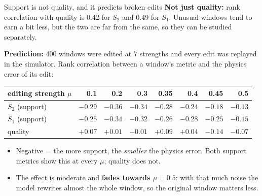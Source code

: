 \documentclass[aspectratio=169,10pt]{beamer}
\begin{document}
\begin{frame}{Support is not quality, and it predicts broken edits}
\textbf{Not just quality:} rank correlation with quality is 0.42 for $S_2$ and 0.49 for $S_1$. Unusual windows tend to earn a bit less, but the two are far from the same, so they can be studied separately.
\vspace{0.6em}

\textbf{Prediction:} 400 windows were edited at 7 strengths and every edit was replayed in the simulator. Rank correlation between a window's metric and the physics error of its edit:
\vspace{0.3em}

\centering
\begin{tabular}{lrrrrrrr}
\toprule
editing strength $\mu$ & 0.1 & 0.2 & 0.3 & 0.35 & 0.4 & 0.45 & 0.5\\
\midrule
$S_2$ (support) & $-0.29$ & $-0.36$ & $-0.34$ & $-0.28$ & $-0.24$ & $-0.18$ & $-0.13$\\
$S_1$ (support) & $-0.25$ & $-0.34$ & $-0.32$ & $-0.26$ & $-0.28$ & $-0.25$ & $-0.15$\\
quality & $+0.07$ & $+0.01$ & $+0.01$ & $+0.09$ & $+0.04$ & $-0.14$ & $-0.07$\\
\bottomrule
\end{tabular}
\vspace{0.5em}

\raggedright
\begin{itemize}
\item Negative = the more support, the \emph{smaller} the physics error. Both support metrics show this at every $\mu$; quality does not.
\item The effect is moderate and \textbf{fades towards $\mu = 0.5$}: with that much noise the model rewrites almost the whole window, so the original window matters less.
\end{itemize}
\end{frame}

\end{document}
